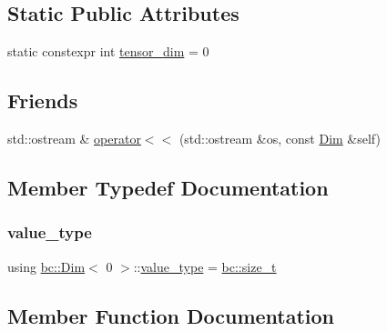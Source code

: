 \subsection*{Static Public Attributes}
\begin{DoxyCompactItemize}
\item 
static constexpr int \hyperlink{structbc_1_1Dim_3_010_01_4_a3896dc5bb858574ede513c58afe1a7ce}{tensor\+\_\+dim} = 0
\end{DoxyCompactItemize}
\subsection*{Friends}
\begin{DoxyCompactItemize}
\item 
std\+::ostream \& \hyperlink{structbc_1_1Dim_3_010_01_4_afaa96bc6b1e916ec02928e3dcae05ad6}{operator$<$$<$} (std\+::ostream \&os, const \hyperlink{structbc_1_1Dim}{Dim} \&self)
\end{DoxyCompactItemize}


\subsection{Member Typedef Documentation}
\mbox{\label{structbc_1_1Dim_3_010_01_4_a561dbc6acbf3e9fe5c4a06aba2f8b968}} 
\subsubsection{\texorpdfstring{value\+\_\+type}{value\_type}}
{\footnotesize\ttfamily using \hyperlink{structbc_1_1Dim}{bc\+::\+Dim}$<$ 0 $>$\+::\hyperlink{structbc_1_1Dim_3_010_01_4_a561dbc6acbf3e9fe5c4a06aba2f8b968}{value\+\_\+type} =  \hyperlink{namespacebc_aaf8e3fbf99b04b1b57c4f80c6f55d3c5}{bc\+::size\+\_\+t}}



\subsection{Member Function Documentation}
\mbox{\label{structbc_1_1Dim_3_010_01_4_abae6a7f5cca642f12146b3b7a1de8af4}} 
